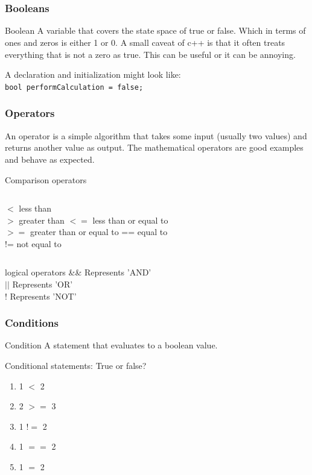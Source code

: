 \documentclass{if-beamer}
\begin{document}
\section{}

\begin{frame}
\frametitle{Booleans}
\begin{block}{Boolean}
	A variable that covers the state space of true or false. Which in terms of ones and zeros is either 1 or 0. A small caveat of c++ is that it often treats everything that is not a zero as true. This can be useful or it can be annoying. 
\end{block}
\medskip
A declaration and initialization might look like: \\
\vspace{1pt}
\texttt{bool performCalculation = false;}
\end{frame}

\begin{frame}
\frametitle{Operators}
An operator is a simple algorithm that takes some input (usually two values) and returns another value as output. The mathematical operators are good examples and behave as expected. 
\begin{block}{Comparison operators}
	\vspace{2pt}
	\begin{columns}[c] %
		$<$ less than\\ $>$ greater than 
		$<=$ less than or equal to\\ $>=$ greater than or equal to 
		== equal to\\ != not equal to
	\end{columns}
\end{block}
\begin{block}{logical operators}
	\&\& Represents 'AND'\\
	$||$ Represents 'OR' \\
	! Represents 'NOT'
\end{block}
\end{frame}

\begin{frame}
\frametitle{Conditions}
\begin{block}{Condition}
A statement that evaluates to a boolean value. 
\end{block}
\begin{block}{Conditional statements: True or false?}
	\begin{enumerate}
		\item 1 $<$ 2
		\item 2 $>=$ 3
		\item 1 $!=$ 2
		\item 1 $==$ 2
		\item 1 $=$ 2
	\end{enumerate}
\end{block}
\end{frame}
\end{document}
